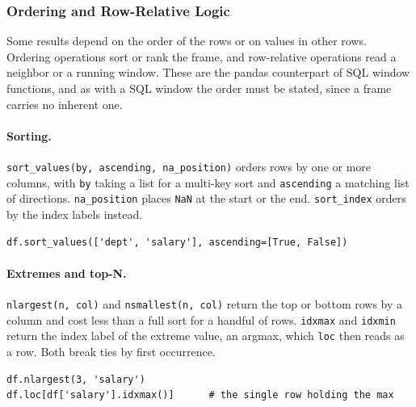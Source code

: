 \subsubsection{Ordering and Row-Relative Logic}

Some results depend on the order of the rows or on values in other rows. Ordering operations sort or rank the frame, and row-relative operations read a neighbor or a running window. These are the pandas counterpart of SQL window functions, and as with a SQL window the order must be stated, since a frame carries no inherent one.

\paragraph{Sorting.} \texttt{sort\_values(by, ascending, na\_position)} orders rows by one or more columns, with \texttt{by} taking a list for a multi-key sort and \texttt{ascending} a matching list of directions. \texttt{na\_position} places \texttt{NaN} at the start or the end. \texttt{sort\_index} orders by the index labels instead.

\begin{lstlisting}[style=python, caption={Multi-key sort with a direction per key}]
df.sort_values(['dept', 'salary'], ascending=[True, False])
\end{lstlisting}

\vspace{-1ex}

\paragraph{Extremes and top-N.} \texttt{nlargest(n, col)} and \texttt{nsmallest(n, col)} return the top or bottom rows by a column and cost less than a full sort for a handful of rows. \texttt{idxmax} and \texttt{idxmin} return the index label of the extreme value, an argmax, which \texttt{loc} then reads as a row. Both break ties by first occurrence.

\begin{lstlisting}[style=python, caption={Top rows and the row of the maximum}]
df.nlargest(3, 'salary')
df.loc[df['salary'].idxmax()]      # the single row holding the max
\end{lstlisting}

\vspace{-1ex}

